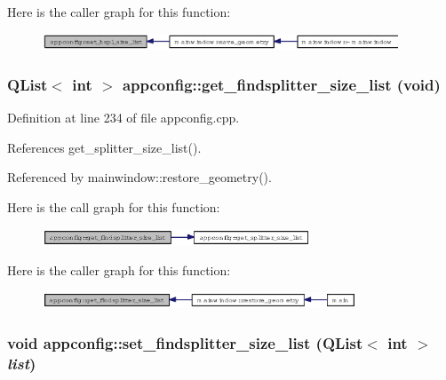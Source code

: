 Here is the caller graph for this function:\begin{figure}[H]
\begin{center}
\leavevmode
\includegraphics[width=300pt]{classappconfig_321f62af83196d0409ab5f2f1197de83_icgraph}
\end{center}
\end{figure}
\subsubsection{\setlength{\rightskip}{0pt plus 5cm}QList$<$ int $>$ appconfig::get\_\-findsplitter\_\-size\_\-list (void)}\label{classappconfig_7ff8392b05f0a5a068a13efbc829e30e}




Definition at line 234 of file appconfig.cpp.

References get\_\-splitter\_\-size\_\-list().

Referenced by mainwindow::restore\_\-geometry().

Here is the call graph for this function:\begin{figure}[H]
\begin{center}
\leavevmode
\includegraphics[width=226pt]{classappconfig_7ff8392b05f0a5a068a13efbc829e30e_cgraph}
\end{center}
\end{figure}


Here is the caller graph for this function:\begin{figure}[H]
\begin{center}
\leavevmode
\includegraphics[width=265pt]{classappconfig_7ff8392b05f0a5a068a13efbc829e30e_icgraph}
\end{center}
\end{figure}
\subsubsection{\setlength{\rightskip}{0pt plus 5cm}void appconfig::set\_\-findsplitter\_\-size\_\-list (QList$<$ int $>$ {\em list})}\label{classappconfig_3d381a23dd11f7c1eaa9516ba2a069da}




